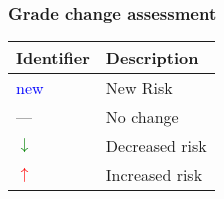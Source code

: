	\vspace{3mm}	
		
	\subsubsection*{Grade change assessment}
	\vspace{2mm}

		\begin{tabularx}{1.0\textwidth}{ | >{\scriptsize}p{20mm} | >{\scriptsize}X |}
			\hline

			\textbf{Identifier} 			& \textbf{Description} 		\\ \hline
			\textcolor{blue}{new} 			& New Risk 					\\ \hline
			\rowcolor[gray]{.98}
			--- 							& No change					\\ \hline
			\textcolor{green}{$\downarrow$} & Decreased risk			\\ \hline
			\rowcolor[gray]{.98}
			\textcolor{red}{$\uparrow$}		& Increased risk 			\\ \hline

		\end{tabularx}
		
